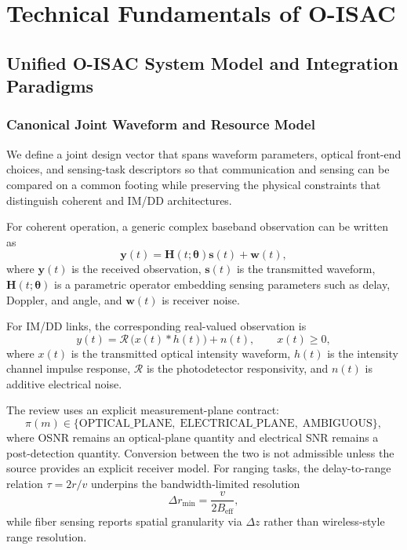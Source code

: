 \section{Technical Fundamentals of O-ISAC}
\label{sec:technical-fundamentals}

\subsection{Unified O-ISAC System Model and Integration Paradigms}

\subsubsection{Canonical Joint Waveform and Resource Model}
We define a joint design vector that spans waveform parameters, optical front-end choices, and sensing-task descriptors so that communication and sensing can be compared on a common footing while preserving the physical constraints that distinguish coherent and IM/DD architectures.

For coherent operation, a generic complex baseband observation can be written as
\begin{equation}
\mathbf{y}(t)=\mathbf{H}(t;\boldsymbol{\theta})\mathbf{s}(t)+\mathbf{w}(t),
\end{equation}
where $\mathbf{y}(t)$ is the received observation, $\mathbf{s}(t)$ is the transmitted waveform, $\mathbf{H}(t;\boldsymbol{\theta})$ is a parametric operator embedding sensing parameters such as delay, Doppler, and angle, and $\mathbf{w}(t)$ is receiver noise.

For IM/DD links, the corresponding real-valued observation is
\begin{equation}
y(t)=\mathcal{R}\,\big(x(t)\ast h(t)\big)+n(t), \qquad x(t)\ge 0,
\end{equation}
where $x(t)$ is the transmitted optical intensity waveform, $h(t)$ is the intensity channel impulse response, $\mathcal{R}$ is the photodetector responsivity, and $n(t)$ is additive electrical noise.

The review uses an explicit measurement-plane contract:
\begin{equation}
\pi(m)\in\{\text{OPTICAL\_PLANE},\;\text{ELECTRICAL\_PLANE},\;\text{AMBIGUOUS}\},
\end{equation}
where OSNR remains an optical-plane quantity and electrical SNR remains a post-detection quantity. Conversion between the two is not admissible unless the source provides an explicit receiver model. For ranging tasks, the delay-to-range relation $\tau=2r/v$ underpins the bandwidth-limited resolution
\begin{equation}
\Delta r_{\min}=\frac{v}{2B_{\text{eff}}},
\end{equation}
while fiber sensing reports spatial granularity via $\Delta z$ rather than wireless-style range resolution.

